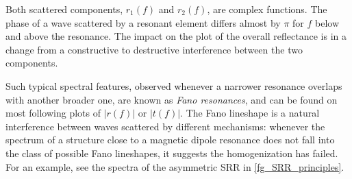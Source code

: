Both scattered components, $r_1(f)$ and $r_2(f)$, are complex functions. The phase of a wave scattered by a resonant element differs almost by $\pi$ for $f$ below and above the resonance. The impact on the plot of the overall reflectance is in a change from a constructive to destructive interference between the two components. 

Such typical spectral features, observed whenever a narrower resonance overlaps with another broader one, are known as \textit{Fano resonances}, and can be found on most following plots of $|r(f)|$ or $|t(f)|$. The Fano lineshape is a natural interference between waves scattered by different mechanisms: whenever the spectrum of a structure close to a magnetic dipole resonance does not fall into the class of possible Fano lineshapes, it suggests the homogenization has failed. For an example, see the spectra of the asymmetric SRR in \ref{fg_SRR_principles}.  

